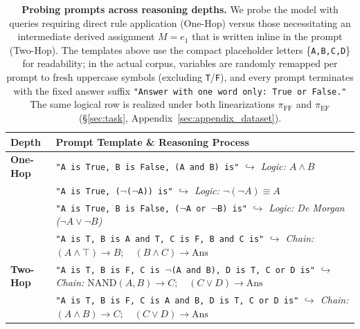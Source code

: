 \documentclass[11pt]{article}
\begin{document}
\begin{table}[t]
\centering
\small
\renewcommand{\arraystretch}{0.9}
\setlength{\tabcolsep}{4pt}
\begin{tabularx}{\columnwidth}{@{}lX@{}}
\toprule
\textbf{Depth} & \textbf{Prompt Template \& Reasoning Process} \\
\midrule
\multirow{3.5}{*}{\textbf{One-Hop}}
& \texttt{"A is True, B is False, (A and B) is"} \newline
  \color{gray}\textit{\footnotesize $\hookrightarrow$ Logic: $A \land B$} \\
\addlinespace[0.4em]
& \texttt{"A is True, ($\lnot$($\lnot$A)) is"} \newline
  \color{gray}\textit{\footnotesize $\hookrightarrow$ Logic: $\lnot(\lnot A) \equiv A$} \\
\addlinespace[0.4em]
& \texttt{"A is True, B is False, ($\lnot$A or $\lnot$B) is"} \newline
  \color{gray}\textit{\footnotesize $\hookrightarrow$ Logic: De Morgan ($\lnot A \lor \lnot B$)} \\
\midrule
\multirow{5}{*}{\textbf{Two-Hop}}
& \texttt{"A is T, B is A and T, C is F, B and C is"} \newline
  \color{gray}\textit{ \footnotesize $\hookrightarrow$ Chain: $(A \land \top) \to B; \quad (B \land C) \to \text{Ans}$} \\
\addlinespace[0.4em]
& \texttt{"A is T, B is F, C is $\lnot$(A and B), D is T, C or D is"} \newline
  \color{gray}\textit{\footnotesize $\hookrightarrow$ Chain: $\text{NAND}(A,B) \to C; \quad (C \lor D) \to \text{Ans}$} \\
\addlinespace[0.4em]
& \texttt{"A is T, B is F, C is A and B, D is T, C or D is"} \newline
  \color{gray}\textit{\footnotesize $\hookrightarrow$ Chain: $(A \land B) \to C; \quad (C \lor D) \to \text{Ans}$} \\
\bottomrule
\end{tabularx}
\caption{\textbf{Probing prompts across reasoning depths.} We probe the model with queries requiring direct rule application (One-Hop) versus those necessitating an intermediate derived assignment $M = e_{1}$ that is written inline in the prompt (Two-Hop). The templates above use the compact placeholder letters \{\texttt{A,B,C,D}\} for readability; in the actual corpus, variables are randomly remapped per prompt to fresh uppercase symbols (excluding \texttt{T}/\texttt{F}), and every prompt terminates with the fixed answer suffix \texttt{"Answer with one word only: True or False."} The same logical row is realized under both linearizations $\pi_{\mathrm{FF}}$ and $\pi_{\mathrm{EF}}$ (\S\ref{sec:task}, Appendix~\ref{sec:appendix_dataset}).}
\label{tab:reasoning_depth}
\end{table}
\end{document}
